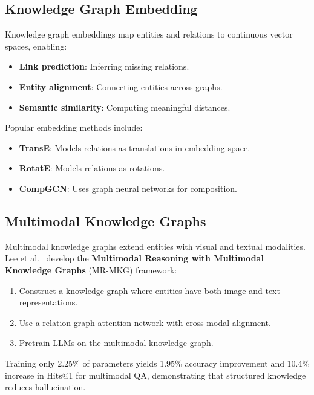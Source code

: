 \documentclass[11pt]{article}
\begin{document}
\subsection{Knowledge Graph Embedding}

Knowledge graph embeddings map entities and relations to continuous vector spaces, enabling:

\begin{itemize}
    \item \textbf{Link prediction}: Inferring missing relations.
    \item \textbf{Entity alignment}: Connecting entities across graphs.
    \item \textbf{Semantic similarity}: Computing meaningful distances.
\end{itemize}

Popular embedding methods include:

\begin{itemize}
    \item \textbf{TransE}: Models relations as translations in embedding space.
    \item \textbf{RotatE}: Models relations as rotations.
    \item \textbf{CompGCN}: Uses graph neural networks for composition.
\end{itemize}

\subsection{Multimodal Knowledge Graphs}

Multimodal knowledge graphs extend entities with visual and textual modalities. Lee et al.~\cite{mrmkg2024} develop the \textbf{Multimodal Reasoning with Multimodal Knowledge Graphs} (MR-MKG) framework:

\begin{enumerate}
    \item Construct a knowledge graph where entities have both image and text representations.
    \item Use a relation graph attention network with cross-modal alignment.
    \item Pretrain LLMs on the multimodal knowledge graph.
\end{enumerate}

Training only 2.25\% of parameters yields 1.95\% accuracy improvement and 10.4\% increase in Hits@1 for multimodal QA, demonstrating that structured knowledge reduces hallucination.
\end{document}
